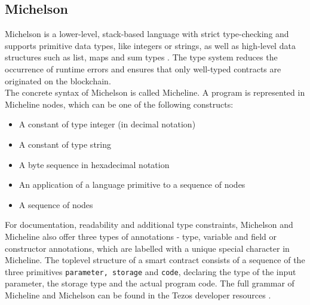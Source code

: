 
\subsection{Michelson}
Michelson is a lower-level, stack-based language with strict type-checking and supports primitive data types, like integers or strings, as well as high-level data structures such as list, maps and sum types \cite{tezos_docs}. The type system reduces the occurrence of runtime errors and ensures that only well-typed contracts are originated on the blockchain. \\
The concrete syntax of Michelson is called Micheline. A program is represented in Micheline nodes, which can be one of the following constructs:
\begin{itemize}
\item A constant of type integer (in decimal notation)
\item A constant of type string
\item A byte sequence in hexadecimal notation
\item An application of a language primitive to a sequence of nodes
\item A sequence of nodes
\end{itemize}
For documentation, readability and additional type constraints, Michelson and Micheline also offer three types of annotations - type, variable and field or constructor annotations, which are labelled with a unique special character in Micheline. The toplevel structure of a smart contract consists of a sequence of the three primitives \texttt{parameter, storage} and \texttt{code}, declaring the type of the input parameter, the storage type and the actual program code. The full grammar of Micheline and Michelson can be found in the Tezos developer resources \cite{tezos_docs}.

